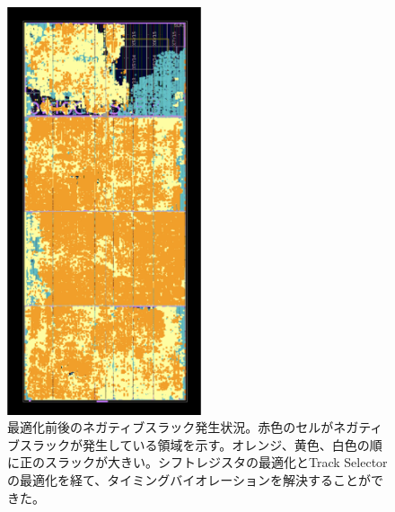\begin{figure}
\begin{minipage}[b]{.33\linewidth}
\end{minipage}%
\begin{minipage}[b]{.33\linewidth}
\centering
\includegraphics[height=12cm]{fig/SL/Metrics_trackselector.png}
\end{minipage}%
\caption[]{最適化前後のネガティブスラック発生状況。赤色のセルがネガティブスラックが発生している領域を示す。オレンジ、黄色、白色の順に正のスラックが大きい。シフトレジスタの最適化とTrack Selectorの最適化を経て、タイミングバイオレーションを解決することができた。}
\label{SL_Metrics}
\end{figure}



